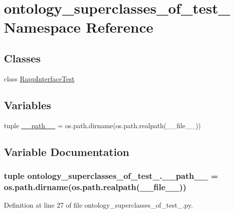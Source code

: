 \hypertarget{namespaceontology__superclasses__of__test__1}{\section{ontology\-\_\-superclasses\-\_\-of\-\_\-test\-\_ Namespace Reference}
\label{namespaceontology__superclasses__of__test__1}
}
\subsection*{Classes}
\begin{DoxyCompactItemize}
\item 
class \hyperlink{classontology__superclasses__of__test__1_1_1RappInterfaceTest}{Rapp\-Interface\-Test}
\end{DoxyCompactItemize}
\subsection*{Variables}
\begin{DoxyCompactItemize}
\item 
tuple \hyperlink{namespaceontology__superclasses__of__test__1_ab94cacefa954a3ba249f3c68f38e0743}{\-\_\-\-\_\-path\-\_\-\-\_\-} = os.\-path.\-dirname(os.\-path.\-realpath(\-\_\-\-\_\-file\-\_\-\-\_\-))
\end{DoxyCompactItemize}


\subsection{Variable Documentation}
\hypertarget{namespaceontology__superclasses__of__test__1_ab94cacefa954a3ba249f3c68f38e0743}{
\subsubsection[{\-\_\-\-\_\-path\-\_\-\-\_\-}]{\setlength{\rightskip}{0pt plus 5cm}tuple ontology\-\_\-superclasses\-\_\-of\-\_\-test\-\_.\-\_\-\-\_\-path\-\_\-\-\_\- = os.\-path.\-dirname(os.\-path.\-realpath(\-\_\-\-\_\-file\-\_\-\-\_\-))}}\label{namespaceontology__superclasses__of__test__1_ab94cacefa954a3ba249f3c68f38e0743}


Definition at line 27 of file ontology\-\_\-superclasses\-\_\-of\-\_\-test\-\_.\-py.

